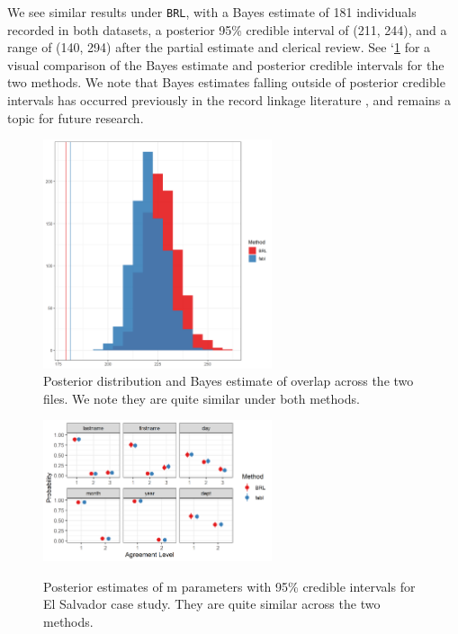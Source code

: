 \documentclass[ba]{imsart}
\begin{document}
	We see similar results under \texttt{BRL}, with a Bayes estimate of 181 individuals recorded in both datasets, a posterior 95\% credible interval of (211, 244), and a range of (140, 294) after the partial estimate and clerical review. See `\ref{fig:overlap-plot} for a visual comparison of the Bayes estimate and posterior credible intervals for the two methods. We note that Bayes estimates falling outside of posterior credible intervals has occurred previously in the record linkage literature \citep{sadinle_bayesian_2017, steorts_bayesian_2016}, and remains a topic for future research.
	
	\begin{figure}[t]
		\begin{center}
			\includegraphics[width=0.6\textwidth]{../notes/figures/el_salvador/overlap_distribution_smallP_bayes}
			\caption{Posterior distribution and Bayes estimate of overlap across the two files. We note they are quite similar under both methods.}
			\label{fig:overlap-plot}
		\end{center}
	\end{figure}
	
	
	\begin{figure}[t]
		\begin{center}
			\includegraphics[width=0.6\textwidth]{../notes/figures/el_salvador/m_posterior_smallP} 
			\caption{Posterior estimates of m parameters with 95\% credible intervals for El Salvador case study. They are quite similar across the two methods.}\label{fig:m-and-u}
			\label{fig:m-and-u}
		\end{center}
	\end{figure}
	
\end{document}
